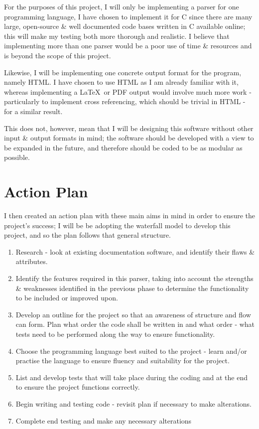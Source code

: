 For the purposes of this project, I will only be implementing a parser for one
programming language, I have chosen to implement it for C since there are many
large, open-source \& well documented code bases written in C available online;
this will make my testing both more thorough and realistic. I believe that
implementing more than one parser would be a poor use of time \& resources and
is beyond the scope of this project.

Likewise, I will be implementing one concrete output format for the program,
namely HTML. I have chosen to use HTML as I am already familiar with it, whereas
implementing a \LaTeX\ or PDF output would involve much more work - particularly
to implement cross referencing, which should be trivial in HTML - for a similar
result.

This does not, however, mean that I will be designing this software without
other input \& output formats in mind; the software should be developed with a
view to be expanded in the future, and therefore should be coded to be as
modular as possible.

\section{Action Plan}
I then created an action plan with these main aims in mind in order to ensure
the project's success; I will be be adopting the waterfall model to develop this
project, and so the plan follows that general structure.
\begin{enumerate}
  \item Research - look at existing documentation software, and identify their
    flaws \& attributes.
  \item Identify the features required in this parser, taking into account the
    strengths \& weaknesses identified in the previous phase to determine the
    functionality to be included or improved upon.
  \item Develop an outline for the project so that an awareness of structure and
    flow can form. Plan what order the code shall be written in and what order -
    what tests need to be performed along the way to ensure functionality.
  \item Choose the programming language best suited to the project - learn
    and/or practise the language to ensure fluency and suitability for the
    project.
  \item List and develop tests that will take place during the coding and at the
    end to ensure the project functions correctly.
  \item Begin writing and testing code - revisit plan if necessary to make
    alterations.
  \item Complete end testing and make any necessary alterations
\end{enumerate}


